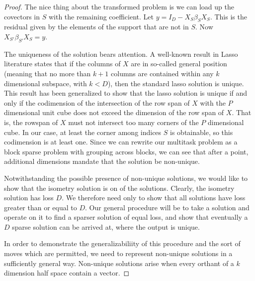 \begin{proof}
The nice thing about the transformed problem is we can load up the covectors in $S$ with the remaining coefficient.
Let $y = I_D - X_S \beta_S X_S$.
This is the residual given by the elements of the support that are not in $S$.
Now $X_{S'} \beta_{S'} X_S = y$.



The uniqueness of the solution bears attention.
A well-known result in Lasso literature states that if the columns of $X$ are in so-called general position (meaning that no more than $k+1$ columns are contained within any $k$ dimensional subspace, with $k < D$), then the standard lasso solution is unique.
This result has been generalized to show that the lasso solution is unique if and only if the codimension of the intersection of the row span of $X$ with the $P$ dimensional unit cube does not exceed the dimension of the row span of $X$.
That is, the rowspan of $X$ must not intersect too many corners of the $P$ dimensional cube.
In our case, at least the corner among indices $S$ is obtainable, so this codimension is at least one.
Since we can rewrite our multitask problem as a block sparse problem with grouping across blocks, we can see that after a point, additional dimensions mandate that the solution be non-unique.

Notwithstanding the possible presence of non-unique solutions, we would like to show that the isometry solution is on of the solutions.
Clearly, the isometry solution has loss $D$.
We therefore need only to show that all solutions have loss greater than or equal to $D$.
Our general procedure will be to take a solution and operate on it to find a sparser solution of equal loss, and show that eventually a $D$ sparse solution can be arrived at, where the output is unique.

In order to demonstrate the generalizabiliity of this procedure and the sort of moves which are permitted, we need to represent non-unique solutions in a sufficiently general way.
Non-unique solutions arise when every orthant of a $k$ dimension half space contain a vector.


 

\end{proof}
